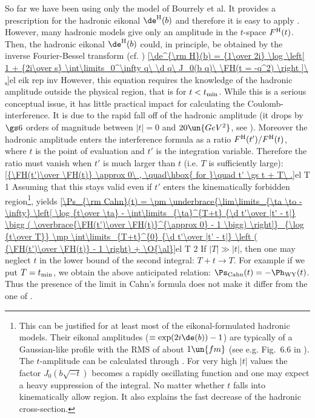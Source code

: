 So far we have been using only the model of Bourrely et al. It provides a prescription for the hadronic eikonal $\de^{\rm H}(b)$ and therefore it is easy to apply . However, many hadronic models give only an amplitude in the $t$-space $F^{\rm H}(t)$. Then, the hadronic eikonal $\de^{\rm H}(b)$ could, in principle, be obtained by the inverse Fourier-Bessel transform (cf. )
\eqref{\de^{\rm H}(b) = {1\over 2i} \log \left[ 1 + {2i\over s} \int\limits_0^\infty q\ \d q\ J_0(b q)\ \FH(t = -q^2)  \right ]\ .}{el eik rep inv}
However, this equation requires the knowledge of the hadronic amplitude outside the physical region, that is for $t < t_{\rm min}$.
While this is a serious conceptual issue, it has little practical impact for calculating the Coulomb-interference. It is due to the rapid fall off of the hadronic amplitude (it drops by $\gs 6$ orders of magnitude between $|t|=0$ and $20\un{GeV^2}$, see ). Moreover the hadronic amplitude enters the interference formula  as a ratio $F^{\rm H}(t') / F^{\rm H}(t)$, where $t$ is the point of evaluation and $t'$ is the integration variable. Therefore the ratio must vanish when $t'$ is much larger than $t$ (i.e. $T$ is sufficiently large):
\eqref{{\FH(t')\over \FH(t)} \approx 0\ , \quad\hbox{ for }\quad t' \gs t + T\ .}{el T 1}
Assuming that this stays valid even if $t'$ enters the kinematically forbidden region\footnote{%
This can be justified for at least most of the eikonal-formulated hadronic models. Their eikonal amplitudes ($\equiv \exp(2i\de(b)) - 1$) are typically of a Gaussian-like profile with the RMS of about $1\un{fm}$ (see e.g. Fig.~6.6 in ). The $t$-amplitude can be calculated through . For very high $|t|$ values the factor $J_0(b\sqrt{-t})$ becomes a rapidly oscillating function and one may expect a heavy suppression of the integral. No matter whether $t$ falls into kinematically allow region. It also explains the fast decrease of the hadronic cross-section. 
},  yields
\eqref{\Ps_{\rm Cahn}(t) =
\pm \underbrace{\lim\limits_{\ta \to -\infty} \left[
	\log {t\over \ta}
	- \int\limits_{\ta}^{T+t} {\d t'\over |t' - t|} \bigg ( \overbrace{\FH(t')\over \FH(t)}^{\approx 0} - 1 \bigg)
\right]}_{\log {t\over T}}
\mp \int\limits_{T+t}^{0} {\d t'\over |t' - t|} \left ( {\FH(t')\over \FH(t)} - 1 \right)
+ \O{\al}}{el T 2}
If $|T| \gg |t|$, then one may neglect $t$ in the lower bound of the second integral: $T+t\rightarrow T$. For example if we put $T=t_{\rm min}$, we obtain the above anticipated relation: $\Ps_{\rm Cahn}(t) = - \Ph_{\rm WY}(t)$. Thus the presence of the limit in Cahn's formula does not make it differ from the one of \WaY.


